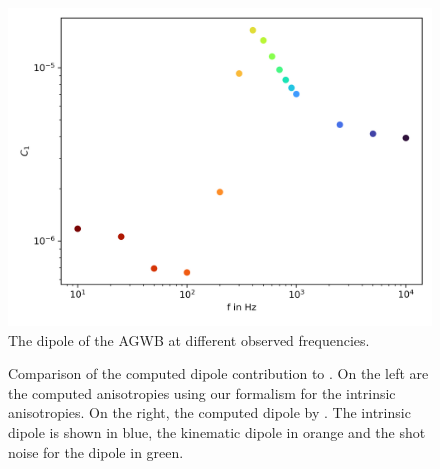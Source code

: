 \begin{figure}
    \centering
    \includegraphics[width=0.8\linewidth]{Images/dipole_frequencies_10000Hz.png}
    \caption{The dipole of the AGWB at different observed frequencies.}
    \label{dipole_1000Hz}
\end{figure} 


\begin{figure}
    \centering
    \caption{Comparison of the computed dipole contribution to \cite{dallarmi_dipole_2022}. On the left are the computed anisotropies using our formalism for the intrinsic anisotropies. On the right, the computed dipole by \cite{dallarmi_dipole_2022}. The intrinsic dipole is shown in blue, the kinematic dipole in orange and the shot noise for the dipole in green.}
    \label{lorenzo_comparison}
\end{figure} 


